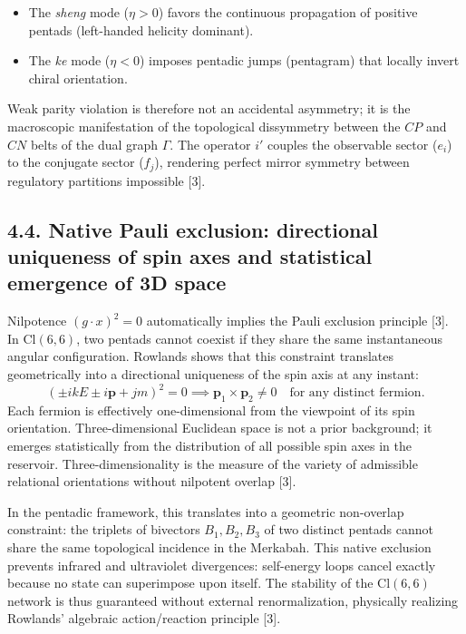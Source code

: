 \documentclass[11pt]{article}
\providecommand{\tightlist}{\setlength{\itemsep}{2pt}\setlength{\parskip}{6pt}}
\providecommand{\tightlist}{%
  \setlength{\itemsep}{2pt}\setlength{\parskip}{6pt}
}
\begin{document}
\begin{itemize}
\tightlist
\item
  The \emph{sheng} mode (\(\eta>0\)) favors the continuous propagation
  of positive pentads (left-handed helicity dominant).
\item
  The \emph{ke} mode (\(\eta<0\)) imposes pentadic jumps (pentagram)
  that locally invert chiral orientation.
\end{itemize}

Weak parity violation is therefore not an accidental asymmetry; it is
the macroscopic manifestation of the topological dissymmetry between the
\(CP\) and \(CN\) belts of the dual graph \(\Gamma\). The operator
\(i'\) couples the observable sector (\(e_i\)) to the conjugate sector
(\(f_j\)), rendering perfect mirror symmetry between regulatory
partitions impossible {[}3{]}.

\hypertarget{native-pauli-exclusion-directional-uniqueness-of-spin-axes-and-statistical-emergence-of-3d-space}{%
\subsection{4.4. Native Pauli exclusion: directional uniqueness of spin
axes and statistical emergence of 3D
space}\label{native-pauli-exclusion-directional-uniqueness-of-spin-axes-and-statistical-emergence-of-3d-space}}

Nilpotence \((g\cdot x)^2 = 0\) automatically implies the Pauli
exclusion principle {[}3{]}. In \(\text{Cl}(6,6)\), two pentads cannot
coexist if they share the same instantaneous angular configuration.
Rowlands shows that this constraint translates geometrically into a
directional uniqueness of the spin axis at any instant: \[
(\pm i k E \pm i \mathbf{p} + j m)^2 = 0 \implies \mathbf{p}_1 \times \mathbf{p}_2 \neq 0 \quad \text{for any distinct fermion}.
\] Each fermion is effectively one-dimensional from the viewpoint of its
spin orientation. Three-dimensional Euclidean space is not a prior
background; it emerges statistically from the distribution of all
possible spin axes in the reservoir. Three-dimensionality is the measure
of the variety of admissible relational orientations without nilpotent
overlap {[}3{]}.

In the pentadic framework, this translates into a geometric non-overlap
constraint: the triplets of bivectors \({B_1, B_2, B_3}\) of two
distinct pentads cannot share the same topological incidence in the
Merkabah. This native exclusion prevents infrared and ultraviolet
divergences: self-energy loops cancel exactly because no state can
superimpose upon itself. The stability of the \(\text{Cl}(6,6)\) network
is thus guaranteed without external renormalization, physically
realizing Rowlands' algebraic action/reaction principle {[}3{]}.
\end{document}
